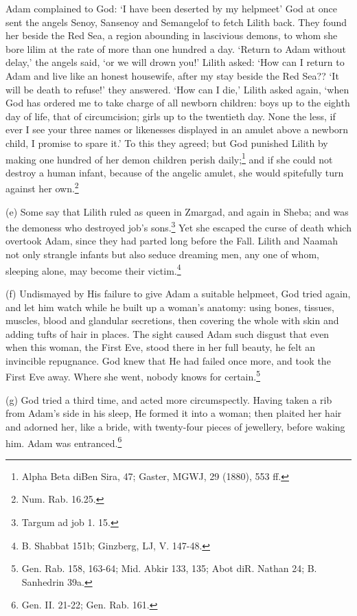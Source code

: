 \documentclass{article}
\begin{document}
Adam complained to God: `I have been deserted by my helpmeet' God
at once sent the angels Senoy, Sansenoy and Semangelof to fetch
Lilith back. They found her beside the Red Sea, a region abounding
in lascivious demons, to whom she bore lilim at the rate of more
than one hundred a day. `Return to Adam without delay,' the angels
said, `or we will drown you!' Lilith asked: `How can I return to
Adam and live like an honest housewife, after my stay beside the
Red Sea?? `It will be death to refuse!' they answered. `How can I
die,' Lilith asked again, `when God has ordered me to take charge
of all newborn children: boys up to the eighth day of life, that
of circumcision; girls up to the twentieth day. None the less, if
ever I see your three names or likenesses displayed in an amulet
above a newborn child, I promise to spare it.' To this they
agreed; but God punished Lilith by making one hundred of her demon
children perish 
daily;\footnote{Alpha Beta diBen Sira, 47; Gaster, MGWJ, 29 (1880), 553 ff.}
and if she could not destroy a human
infant, because of the angelic amulet, she would spitefully turn
against her own.\footnote{Num. Rab. 16.25.}

(e) Some say that Lilith ruled as queen in Zmargad, and again in
Sheba; and was the demoness who destroyed job's 
sons.\footnote{Targum ad job 1. 15.} Yet she escaped the curse of death which 
overtook Adam, since they had parted long before the Fall. Lilith and 
Naamah not only strangle infants but also seduce dreaming men, any one of 
whom, sleeping alone, may become their 
victim.\footnote{B. Shabbat 151b; Ginzberg, LJ, V. 147-48.}

(f) Undismayed by His failure to give Adam a suitable helpmeet,
God tried again, and let him watch while he built up a woman's
anatomy: using bones, tissues, muscles, blood and glandular
secretions, then covering the whole with skin and adding tufts of
hair in places. The sight caused Adam such disgust that even when
this woman, the First Eve, stood there in her full beauty, he felt
an invincible repugnance. God knew that He had failed once more,
and took the First Eve away. Where she went, nobody knows for
certain.\footnote{Gen. Rab. 158, 163-64; Mid. Abkir 133, 135; 
Abot diR. Nathan 24; B. Sanhedrin 39a.}

(g) God tried a third time, and acted more circumspectly. Having
taken a rib from Adam's side in his sleep, He formed it into a
woman; then plaited her hair and adorned her, like a bride, with
twenty-four pieces of jewellery, before waking him. Adam was
entranced.\footnote{Gen. II. 21-22; Gen. Rab. 161.}
\end{document}
